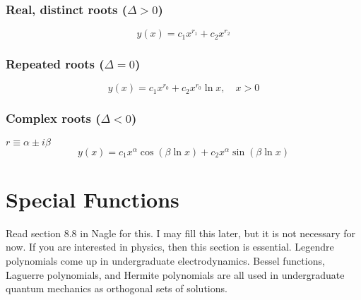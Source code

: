 \subsubsection{Real, distinct roots ($\Delta > 0$)}
\begin{equation}
    y(x) = c_1 x^{r_1} + c_2 x^{r_2} 
\end{equation}

\subsubsection{Repeated roots ($\Delta = 0$)}
\begin{equation}
    y(x) = c_1 x^{r_0} + c_2 x^{r_0} \ln x , \quad x > 0
\end{equation}

\subsubsection{Complex roots ($\Delta < 0$)}
$r \equiv \alpha \pm i \beta$
\begin{equation}
    y(x) = c_1 x^{\alpha} \cos{(\beta \ln x)} + c_2 x^{\alpha} \sin{(\beta \ln x)}
\end{equation}


\section{Special Functions}
Read section 8.8 in Nagle for this. I may fill this later, but it is not necessary for now. If you are interested in physics, then this section is essential. Legendre polynomials come up in undergraduate electrodynamics. Bessel functions, Laguerre polynomials, and Hermite polynomials are all used in undergraduate quantum mechanics as orthogonal sets of solutions.

